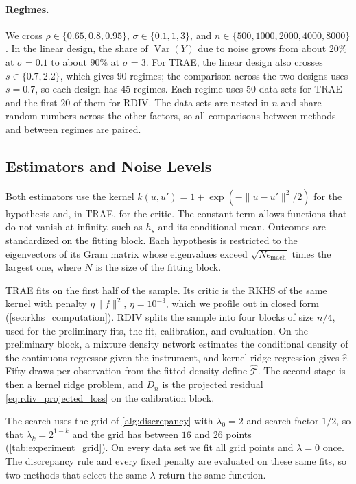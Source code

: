 \documentclass[12pt]{article}
\theoremstyle{plain}
\theoremstyle{definition}
\theoremstyle{remark}
\begin{document}
\paragraph{Regimes.}
We cross $\rho\in\{0.65,0.8,0.95\}$, $\sigma\in\{0.1,1,3\}$, and $n\in\{500,\allowbreak1000,\allowbreak2000,\allowbreak4000,\allowbreak8000\}$. In the linear design, the share of $\operatorname{Var}(Y)$ due to noise grows from about $20\%$ at $\sigma=0.1$ to about $90\%$ at $\sigma=3$. For TRAE, the linear design also crosses $s\in\{0.7,2.2\}$, which gives $90$ regimes; the comparison across the two designs uses $s=0.7$, so each design has $45$ regimes. Each regime uses $50$ data sets for TRAE and the first $20$ of them for RDIV. The data sets are nested in $n$ and share random numbers across the other factors, so all comparisons between methods and between regimes are paired.

\subsection{Estimators and Noise Levels}
\label{sec:experiment_estimators}

Both estimators use the kernel $k(u,u')=1+\exp(-\|u-u'\|^2/2)$ for the hypothesis and, in TRAE, for the critic. The constant term allows functions that do not vanish at infinity, such as $h_s$ and its conditional mean. Outcomes are standardized on the fitting block. Each hypothesis is restricted to the eigenvectors of its Gram matrix whose eigenvalues exceed $\sqrt{N\epsilon_{\mathrm{mach}}}$ times the largest one, where $N$ is the size of the fitting block.

TRAE fits on the first half of the sample. Its critic is the RKHS of the same kernel with penalty $\eta\|f\|^2$, $\eta=10^{-3}$, which we profile out in closed form (\cref{sec:rkhs_computation}). RDIV splits the sample into four blocks of size $n/4$, used for the preliminary fits, the fit, calibration, and evaluation. On the preliminary block, a mixture density network estimates the conditional density of the continuous regressor given the instrument, and kernel ridge regression gives $\hat r$. Fifty draws per observation from the fitted density define $\hat{\mathcal T}$. The second stage is then a kernel ridge problem, and $D_n$ is the projected residual \eqref{eq:rdiv_projected_loss} on the calibration block.

The search uses the grid of \cref{alg:discrepancy} with $\lambda_0=2$ and search factor $1/2$, so that $\lambda_k=2^{1-k}$ and the grid has between $16$ and $26$ points (\cref{tab:experiment_grid}). On every data set we fit all grid points and $\lambda=0$ once. The discrepancy rule and every fixed penalty are evaluated on these same fits, so two methods that select the same $\lambda$ return the same function.
\end{document}
